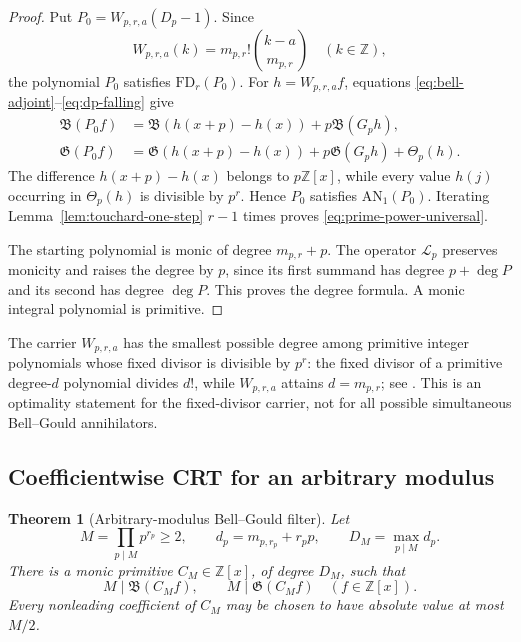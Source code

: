 \documentclass[11pt]{article}
\newtheorem{theorem}{Theorem}[section]
\theoremstyle{definition}
\theoremstyle{remark}
\newcommand{\Z}{\mathbb Z}
\begin{document}
\begin{proof}
Put \(P_0=W_{p,r,a}(D_p-1)\).  Since
\[
 W_{p,r,a}(k)=m_{p,r}!\binom{k-a}{m_{p,r}}
 \quad(k\in\Z),
\]
the polynomial \(P_0\) satisfies \(\mathrm{FD}_r(P_0)\).  For
\(h=W_{p,r,a}f\), equations
\eqref{eq:bell-adjoint}--\eqref{eq:dp-falling} give
\begin{align*}
 \mathfrak B(P_0f)
 &=\mathfrak B(h(x+p)-h(x))+p\mathfrak B(G_ph),\\
 \mathfrak G(P_0f)
 &=\mathfrak G(h(x+p)-h(x))+p\mathfrak G(G_ph)
   +\Theta_p(h).
\end{align*}
The difference \(h(x+p)-h(x)\) belongs to \(p\Z[x]\), while every value
\(h(j)\) occurring in \(\Theta_p(h)\) is divisible by \(p^r\).  Hence
\(P_0\) satisfies \(\mathrm{AN}_1(P_0)\).  Iterating
Lemma~\ref{lem:touchard-one-step} \(r-1\) times proves
\eqref{eq:prime-power-universal}.

The starting polynomial is monic of degree \(m_{p,r}+p\).
The operator \(\mathcal L_p\) preserves monicity and raises the degree by
\(p\), since its first summand has degree \(p+\deg P\) and its second has
degree \(\deg P\).  This proves the degree formula.  A monic integral
polynomial is primitive.
\end{proof}

The carrier \(W_{p,r,a}\) has the smallest possible degree among primitive
integer polynomials whose fixed divisor is divisible by \(p^r\): the fixed
divisor of a primitive degree-\(d\) polynomial divides \(d!\), while
\(W_{p,r,a}\) attains \(d=m_{p,r}\); see
\cite{PrasadRajkumarReddy2019}.  This is an optimality statement for the
fixed-divisor carrier, not for all possible simultaneous Bell--Gould
annihilators.

\subsection{Coefficientwise CRT for an arbitrary modulus}

\begin{theorem}[Arbitrary-modulus Bell--Gould filter]
\label{thm:bell-gould-arbitrary-modulus}
Let
\[
 M=\prod_{p\mid M}p^{r_p}\geq2,
 \qquad
 d_p=m_{p,r_p}+r_pp,
 \qquad
 D_M=\max_{p\mid M}d_p.
\]
There is a monic primitive \(C_M\in\Z[x]\), of degree \(D_M\), such that
\begin{equation}\label{eq:arbitrary-modulus-universal}
 M\mid\mathfrak B(C_Mf),
 \qquad
 M\mid\mathfrak G(C_Mf)
 \quad(f\in\Z[x]).
\end{equation}
Every nonleading coefficient of \(C_M\) may be chosen to have absolute
value at most \(M/2\).
\end{theorem}
\end{document}
